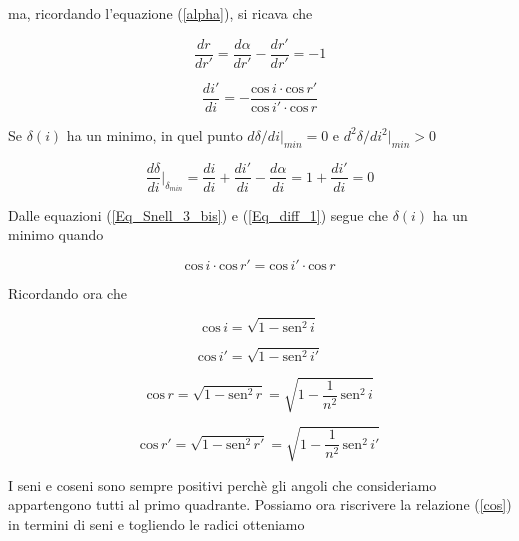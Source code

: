 \documentclass{article}
\begin{document}
\vspace{2mm}

ma, ricordando l'equazione (\ref{alpha}), si ricava che

\begin{equation}
\frac{dr}{dr'}=\frac{d\alpha}{dr'}-\frac{dr'}{dr'}=-1
\end{equation}

\begin{equation}
\frac{di'}{di}=-\frac{\textrm{cos}\,i \cdot \textrm{cos}\, r'}{\textrm{cos}\,i' \cdot \textrm{cos}\, r}
\label{Eq_Snell_3_bis}
\end{equation}

\vspace{3mm}

Se $\delta (i)$ ha un minimo, in quel punto $d \delta /di |_{min} = 0$ e $d^2 \delta /di^2 |_{min} > 0$

\vspace{3mm}

\begin{equation}
\frac{d\delta}{di}\bigg|_{\delta_{min}} = \frac{di}{di} + \frac{di'}{di} -\frac{d\alpha}{di}=1+\frac{di'}{di} = 0
\label{Eq_diff_1}
\end{equation}

\vspace{2mm}

Dalle equazioni (\ref{Eq_Snell_3_bis}) e (\ref{Eq_diff_1}) segue che $\delta (i)$ ha un minimo quando 

\begin{equation}
\textrm{cos}\,i \cdot \textrm{cos}\, r' = \textrm{cos}\,i' \cdot \textrm{cos}\, r
\label{cos}
\end{equation}

Ricordando ora che 

\[\textrm{cos}\,i = \sqrt{1-\textrm{sen}^2\,i}\]

\[\textrm{cos}\,i' = \sqrt{1-\textrm{sen}^2\,i'}\]

\[\textrm{cos}\,r = \sqrt{1-\textrm{sen}^2\,r} = \sqrt{1-\frac{1}{n^2}\, \textrm{sen}^2\,i}\]

\[\textrm{cos}\,r' = \sqrt{1-\textrm{sen}^2\,r'} = \sqrt{1-\frac{1}{n^2}\, \textrm{sen}^2\,i'}\]

\vspace{2mm}

I seni e coseni sono sempre positivi perchè gli angoli che consideriamo appartengono tutti al primo quadrante. Possiamo ora riscrivere la relazione (\ref{cos}) in termini di seni e togliendo le radici otteniamo
\end{document}
